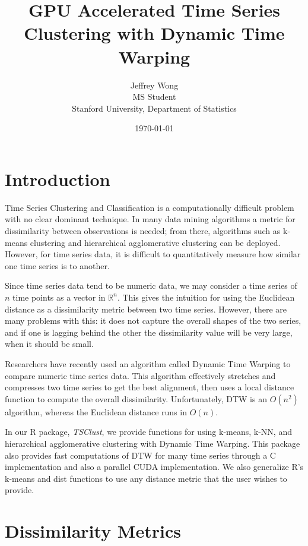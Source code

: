 \documentclass{article}
\title{GPU Accelerated Time Series Clustering with Dynamic Time Warping}
\date{\today}
\author{Jeffrey Wong\\MS Student\\Stanford University, Department of Statistics}
\begin{document}
\maketitle

\newpage

\tableofcontents

\newpage

\section{Introduction}

Time Series Clustering and Classification is a computationally difficult problem
with no clear dominant technique.  In many data mining algorithms a metric for 
dissimilarity between observations is needed; from there, algorithms such as 
k-means clustering and hierarchical agglomerative clustering can be deployed.  
However, for time series data, it is difficult to quantitatively measure how 
similar one time series is to another.  

Since time series data tend to be numeric data, we may consider a time series of 
$n$ time points as a vector in $\mathbb{R}^n$.  This gives the intuition for 
using the Euclidean distance as a dissimilarity metric between two time series.  
However, there are many problems with this: it does not capture the 
overall shapes of the two series, and if one is lagging behind the other
the dissimilarity value will be very large, when it should be small.  

Researchers have recently used an algorithm called Dynamic Time Warping to compare 
numeric time series data.  This algorithm effectively stretches and compresses 
two time series to get the best alignment, then uses a local distance function 
to compute the overall dissimilarity.  Unfortunately, DTW is an $O(n^2)$ algorithm, 
whereas the Euclidean distance runs in $O(n)$.  

In our R package, \textit{TSClust}, we provide functions for using k-means, k-NN, and 
hierarchical agglomerative clustering with Dynamic Time Warping.  This package also
provides fast computations of DTW for many time series through a C implementation
and also a parallel CUDA implementation.  We also generalize R's k-means and dist 
functions to use any distance metric that the user wishes to provide.

\section{Dissimilarity Metrics}
\end{document}
